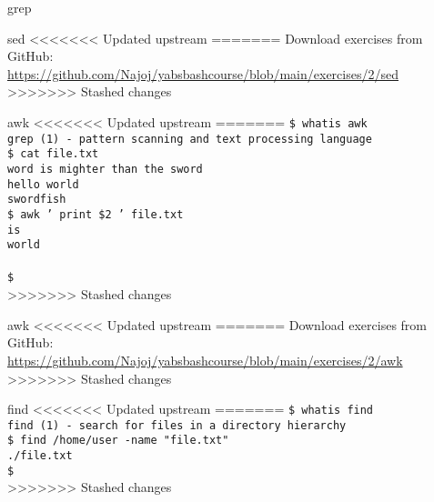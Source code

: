 \documentclass{beamer}
\let\tt\texttt
\begin{document}
\begin{frame}{grep}
\begin{frame}{sed}
<<<<<<< Updated upstream
=======
        Download exercises from GitHub: \\
        \url{https://github.com/Najoj/yabsbashcourse/blob/main/exercises/2/sed}
>>>>>>> Stashed changes
\end{frame}

\begin{frame}{awk}
<<<<<<< Updated upstream
=======
        \tt{\$ whatis awk}\\
        \tt{grep (1)  - pattern scanning and text processing language}\\
        \tt{\$ cat file.txt} \\
        \tt{word is mighter than the sword} \\
        \tt{hello world} \\
        \tt{swordfish} \\
        \tt{\$ awk '{ print \$2 }' file.txt} \\
        \tt{is} \\
        \tt{world} \\
        \tt{} \\
        \tt{\$ } \\
>>>>>>> Stashed changes
\end{frame}

\begin{frame}{awk}
<<<<<<< Updated upstream
=======
        Download exercises from GitHub: \\
        \url{https://github.com/Najoj/yabsbashcourse/blob/main/exercises/2/awk}
>>>>>>> Stashed changes
\end{frame}

\begin{frame}{find}
<<<<<<< Updated upstream
=======
        \tt{\$ whatis find}\\
        \tt{find (1)  - search for files in a directory hierarchy}\\
        \tt{\$ find /home/user -name "file.txt"} \\
        \tt{./file.txt} \\
        \tt{\$ } \\
>>>>>>> Stashed changes
\end{frame}


\end{frame}
\end{document}

